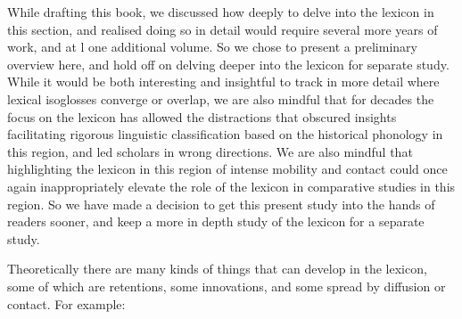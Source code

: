 While drafting this book,
we discussed how deeply to delve into the lexicon in this section,
and realised doing so in detail would require several more years
of work, and at l one additional volume.
So we chose to present a preliminary overview here,
and hold off on delving deeper into the lexicon for separate study.
While it would be both interesting
and insightful to track in more detail where lexical isoglosses
converge or overlap, we are also mindful that for decades the focus on the lexicon
has allowed the distractions that obscured insights facilitating
rigorous linguistic classification based on the historical phonology
in this region, and led scholars in wrong directions.
We are also mindful that highlighting the lexicon in this region
of intense mobility and contact could once again inappropriately elevate the role
of the lexicon in comparative studies in this region.
So we have made a decision to get this present study into the
hands of readers sooner,
and keep a more in depth study of the lexicon for a separate study.

Theoretically there are many kinds of things that can develop
in the lexicon, some of which are retentions,
some innovations, and some spread by diffusion or contact.
For example: 

